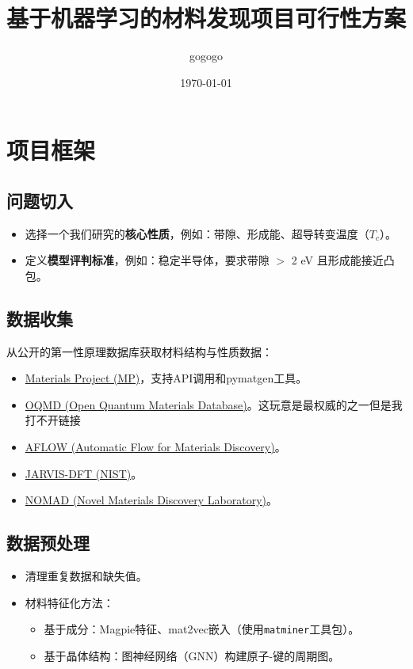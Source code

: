 \documentclass[12pt,a4paper]{article}
\title{基于机器学习的材料发现项目可行性方案}
\author{gogogo}
\date{\today}
\begin{document}
\maketitle


\section{项目框架}
\subsection{问题切入}
\begin{itemize}
    \item 选择一个我们研究的\textbf{核心性质}，例如：带隙、形成能、超导转变温度（$T_c$）。
    \item 定义\textbf{模型评判标准}，例如：稳定半导体，要求带隙 $>$ 2 eV 且形成能接近凸包。
\end{itemize}

\subsection{数据收集}
从公开的第一性原理数据库获取材料结构与性质数据：
\begin{itemize}
    \item \href{https://materialsproject.org}{Materials Project (MP)}，支持API调用和pymatgen工具。
    \item \href{http://oqmd.org}{OQMD (Open Quantum Materials Database)}。这玩意是最权威的之一但是我打不开链接
    \item \href{http://www.aflowlib.org}{AFLOW (Automatic Flow for Materials Discovery)}。
    \item \href{https://jarvis.nist.gov}{JARVIS-DFT (NIST)}。
    \item \href{https://nomad-lab.eu}{NOMAD (Novel Materials Discovery Laboratory)}。
\end{itemize}

\subsection{数据预处理}
\begin{itemize}
    \item 清理重复数据和缺失值。
    \item 材料特征化方法：
    \begin{itemize}
        \item 基于成分：Magpie特征、mat2vec嵌入（使用\texttt{matminer}工具包）。
        \item 基于晶体结构：图神经网络（GNN）构建原子-键的周期图。
    \end{itemize}
\end{itemize}
\end{document}
